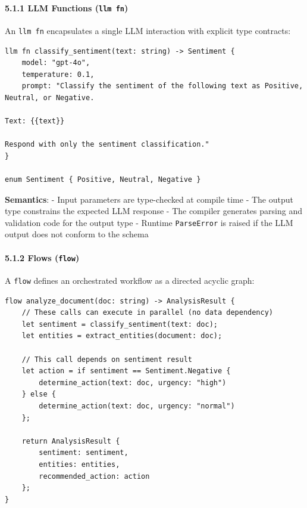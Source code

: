 \documentclass[
]{article}
\newcommand{\passthrough}[1]{#1}
\begin{document}
\paragraph{\texorpdfstring{5.1.1 LLM Functions
(\texttt{llm\ fn})}{5.1.1 LLM Functions (llm fn)}}\label{llm-functions-llm-fn}

An \passthrough{\lstinline!llm fn!} encapsulates a single LLM
interaction with explicit type contracts:

\begin{lstlisting}
llm fn classify_sentiment(text: string) -> Sentiment {
    model: "gpt-4o",
    temperature: 0.1,
    prompt: "Classify the sentiment of the following text as Positive, Neutral, or Negative.

Text: {{text}}

Respond with only the sentiment classification."
}

enum Sentiment { Positive, Neutral, Negative }
\end{lstlisting}

\textbf{Semantics}: - Input parameters are type-checked at compile time
- The output type constrains the expected LLM response - The compiler
generates parsing and validation code for the output type - Runtime
\passthrough{\lstinline!ParseError!} is raised if the LLM output does
not conform to the schema

\paragraph{\texorpdfstring{5.1.2 Flows
(\texttt{flow})}{5.1.2 Flows (flow)}}\label{flows-flow}

A \passthrough{\lstinline!flow!} defines an orchestrated workflow as a
directed acyclic graph:

\begin{lstlisting}
flow analyze_document(doc: string) -> AnalysisResult {
    // These calls can execute in parallel (no data dependency)
    let sentiment = classify_sentiment(text: doc);
    let entities = extract_entities(document: doc);
    
    // This call depends on sentiment result
    let action = if sentiment == Sentiment.Negative {
        determine_action(text: doc, urgency: "high")
    } else {
        determine_action(text: doc, urgency: "normal")
    };
    
    return AnalysisResult {
        sentiment: sentiment,
        entities: entities,
        recommended_action: action
    };
}
\end{lstlisting}
\end{document}
